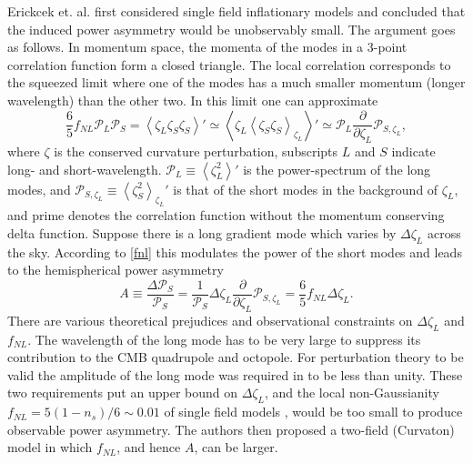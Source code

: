 \documentclass[12pt]{article}
\numberwithin{equation}{section}
\newcommand{\comment}[1]{}
\def\bsb{\boldsymbol}
\def\be{\begin{equation}}
\def\ee{\end{equation}}
\def\d{\partial}
\def\P{\mathcal{P}}
\newcommand{\mal}[1]{\mathcal #1}
\newcommand{\expect}[1]{\left\langle #1 \right\rangle}
\begin{document}
Erickcek et. al. first considered single field inflationary models and concluded that the induced power asymmetry would be unobservably small. The argument goes as follows. In momentum space, the momenta of the modes in a 3-point correlation function form a closed triangle. The local correlation corresponds to the squeezed limit where one of the modes has a much smaller momentum (longer wavelength) than the other two. In this limit one can approximate
\be
\label{fnl}
\frac{6}{5}f_{NL} \mal P_L \mal P_S=\expect{\zeta_L \zeta_S\zeta_S}'\simeq\expect{\zeta_L \expect{\zeta_S\zeta_S}_{\zeta_L}}'\simeq \mal P_L \frac{\d}{\d\zeta_L} \mal P_{S,\zeta_L},
\ee
where $\zeta$ is the conserved curvature perturbation, subscripts $L$ and $S$ indicate long- and short-wavelength. $\P_{L}\equiv \expect{\zeta_{L}^2}'$ is the power-spectrum of the long modes, and $\P_{S,\zeta_L}\equiv \expect{\zeta_S^2}_{\zeta_L}'$ is that of the short modes in the background of $\zeta_L$, and prime denotes the correlation function without the momentum conserving delta function.\comment{\footnote{In writing the left-hand side as a local non-Gaussianity we are ignoring scenarios with more singular than $1/k_L^3$ behavior.}} Suppose there is a long gradient mode which varies by $\Delta \zeta_L$ across the sky. According to \eqref{fnl} this modulates the power of the short modes and leads to the hemispherical power asymmetry 
\be
\label{A}
A\equiv \frac{\Delta \mal P_S}{\mal P_S}=\frac{1}{\mal P_S}\Delta\zeta_L \frac{\d}{\d\zeta_L} \mal P_{S,\zeta_L}=\frac{6}{5}f_{NL}\Delta \zeta_L.
\ee
There are various theoretical prejudices and observational constraints on $\Delta \zeta_L$ and $f_{NL}$. The wavelength of the long mode has to be very large to suppress its contribution to the CMB quadrupole and octopole. For perturbation theory to be valid the amplitude of the long mode was required in \cite{Erickcek} to be less than unity. These two requirements put an upper bound on $\Delta\zeta_L$, and the local non-Gaussianity $f_{NL}=5(1-n_s)/6 \sim 0.01$ of single field models \cite{Maldacena}, would be too small to produce observable power asymmetry. The authors then proposed a two-field (Curvaton) model in which $f_{NL}$, and hence $A$, can be larger. 
\end{document}
